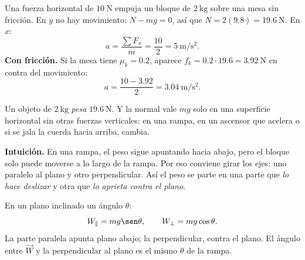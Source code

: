\documentclass[11pt,a4paper]{article}
\begin{document}
\begin{ejemplo}
Una fuerza horizontal de $\SI{10}{\newton}$ empuja un bloque de $\SI{2}{\kilo\gram}$ sobre una mesa sin fricción.
En $y$ no hay movimiento: $N-mg=0$, así que $N=2(9.8)=\SI{19.6}{\newton}$. En $x$:
\[ a=\frac{\sum F_x}{m}=\frac{10}{2}=\SI{5}{\meter\per\second\squared}. \]
\textbf{Con fricción.} Si la mesa tiene $\mu_k=0.2$, aparece $f_k=0.2\cdot19.6=\SI{3.92}{\newton}$ en contra del movimiento:
\[ a=\frac{10-3.92}{2}=\SI{3.04}{\meter\per\second\squared}. \]
\end{ejemplo}
\begin{ojo}
Un objeto de $\SI{2}{\kilo\gram}$ \emph{pesa} $\SI{19.6}{\newton}$. Y la normal vale $mg$ solo en una superficie horizontal sin
otras fuerzas verticales: en una rampa, en un ascensor que acelera o si se jala la cuerda hacia arriba, cambia.
\end{ojo}


\textbf{Intuición.} En una rampa, el peso sigue apuntando hacia abajo, pero el bloque solo puede moverse a lo largo
de la rampa. Por eso conviene girar los ejes: uno paralelo al plano y otro perpendicular. Así el peso se parte en
una parte que \emph{lo hace deslizar} y otra que \emph{lo aprieta contra el plano}.

\begin{minipage}[c]{0.47\linewidth}
\begin{definicion}
En un plano inclinado un ángulo $\theta$:
\[ W_{\parallel}=mg\sen\theta,\qquad W_{\perp}=mg\cos\theta. \]
La parte paralela apunta plano abajo; la perpendicular, contra el plano. El ángulo entre $\vec W$ y la
perpendicular al plano es el mismo $\theta$ de la rampa.
\end{definicion}
\end{minipage}\hfill
\begin{minipage}[c]{0.5\linewidth}\centering
{}
\end{minipage}
\end{document}
